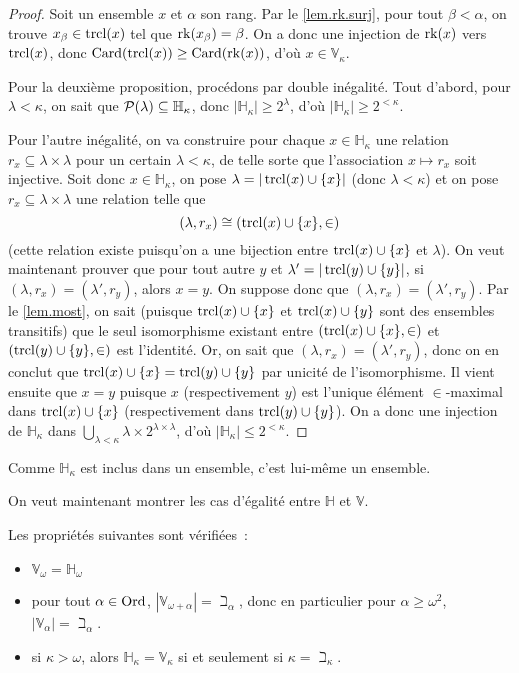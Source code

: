 \begin{proof}
  Soit un ensemble $x$ et $\alpha$ son rang. Par le \cref{lem.rk.surj}, pour
  tout $\beta < \alpha$, on trouve $x_\beta \in \operatorname{trcl}(x)$ tel que
  $\operatorname{rk}(x_\beta) = \beta$. On a donc une injection de $\operatorname{rk}(x)$ vers $\operatorname{trcl}(x)$,
  donc $\operatorname{Card}(\operatorname{trcl}(x)) \geq \operatorname{Card}(\operatorname{rk}(x))$, d'où $x \in \mathbb V_\kappa$.

  Pour la deuxième proposition, procédons par double inégalité. Tout d'abord,
  pour $\lambda < \kappa$, on sait que
  $\mathcal{P}(\lambda) \subseteq \mathbb H_\kappa$, donc
  $|\mathbb H_\kappa| \geq 2^\lambda$, d'où $|\mathbb H_\kappa| \geq 2^{<\kappa}$.

  Pour l'autre inégalité, on va construire pour chaque $x \in \mathbb H_\kappa$
  une relation $r_x \subseteq \lambda \times \lambda$ pour un certain
  $\lambda < \kappa$, de telle sorte que l'association $x \mapsto r_x$ soit
  injective. Soit donc $x \in \mathbb H_\kappa$, on pose
  $\lambda = |\operatorname{trcl}(x)\cup \{x\}|$ (donc $\lambda < \kappa$) et on pose
  $r_x\subseteq \lambda \times \lambda$ une relation telle que
  \[(\lambda,r_x)\cong (\operatorname{trcl}(x)\cup \{x\}, \in)\]
  (cette relation existe puisqu'on a une bijection entre $\operatorname{trcl}(x)\cup\{x\}$ et
  $\lambda$). On veut maintenant prouver que pour tout autre $y$ et
  $\lambda' = |\operatorname{trcl}(y)\cup\{y\}|$, si $(\lambda, r_x) = (\lambda',r_y)$, alors
  $x = y$. On suppose donc que $(\lambda, r_x) = (\lambda',r_y)$. Par le
  \cref{lem.most}, on sait (puisque $\operatorname{trcl}(x)\cup \{x\}$ et $\operatorname{trcl}(x)\cup \{y\}$
  sont des ensembles transitifs) que le seul isomorphisme existant entre
  $(\operatorname{trcl}(x)\cup \{x\},\in)$ et $(\operatorname{trcl}(y)\cup\{y\},\in)$ est l'identité. Or,
  on sait que $(\lambda,r_x) = (\lambda',r_y)$, donc on en conclut que
  $\operatorname{trcl}(x)\cup \{x\} = \operatorname{trcl}(y)\cup \{y\}$ par unicité de l'isomorphisme.
  Il vient ensuite que $x = y$ puisque $x$ (respectivement $y$) est l'unique
  élément $\in$-maximal dans $\operatorname{trcl}(x)\cup \{x\}$ (respectivement dans
  $\operatorname{trcl}(y)\cup\{y\}$). On a donc une injection de $\mathbb H_\kappa$ dans
  $\displaystyle\bigcup_{\lambda < \kappa}\lambda \times 2^{\lambda \times \lambda}$,
  d'où $|\mathbb H_\kappa| \leq 2^{<\kappa}$.
\end{proof}

Comme $\mathbb H_\kappa$ est inclus dans un ensemble, c'est lui-même un
ensemble.

On veut maintenant montrer les cas d'égalité entre $\mathbb H$ et $\mathbb V$.

\begin{property}
  Les propriétés suivantes sont vérifiées~:
  \begin{itemize}
  \item $\mathbb V_\omega = \mathbb H_\omega$
  \item pour tout $\alpha\in\operatorname{Ord}$, $|\mathbb V_{\omega + \alpha}| = \beth_\alpha$,
    donc en particulier pour $\alpha \geq \omega^2$,
    $|\mathbb V_\alpha| = \beth_\alpha$.
  \item si $\kappa > \omega$, alors $\mathbb H_\kappa = \mathbb V_\kappa$
    si et seulement si $\kappa = \beth_\kappa$.
  \end{itemize}
\end{property}

